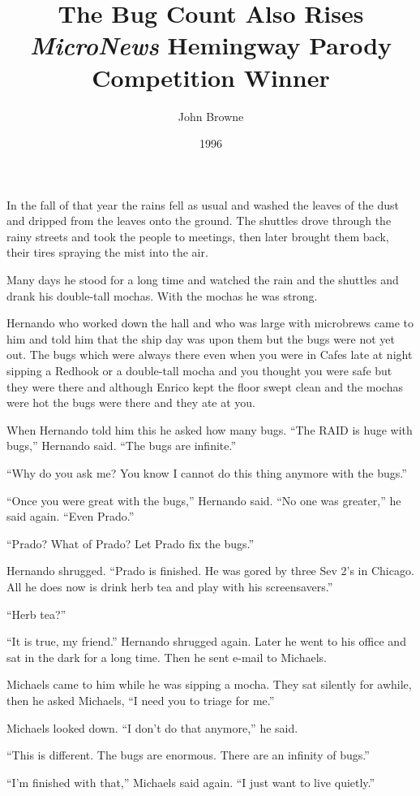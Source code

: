 \documentclass[12pt,letterpaper]{article}
\title{The Bug Count Also Rises\\
\normalsize \textit{MicroNews} Hemingway Parody Competition Winner}
\author{John Browne}
\date{1996}
\begin{document}
\maketitle

\noindent In the fall of that year the rains fell as usual and washed
the leaves of the dust and dripped from the leaves onto the
ground. The shuttles drove through the rainy streets and took the
people to meetings, then later brought them back, their tires spraying
the mist into the air.

Many days he stood for a long time and watched
the rain and the shuttles and drank his double-tall mochas. With the
mochas he was strong.

Hernando who worked down the hall and who was large with microbrews
came to him and told him that the ship day was upon them but the bugs
were not yet out. The bugs which were always there even when you were
in Cafes late at night sipping a Redhook or a double-tall mocha and
you thought you were safe but they were there and although Enrico kept
the floor swept clean and the mochas were hot the bugs were there and
they ate at you.

When Hernando told him this he asked how many bugs.
``The RAID is huge with bugs,'' Hernando said. ``The bugs are infinite.''

``Why do you ask me? You know I cannot do this thing anymore with the
bugs.''

``Once you were great with the bugs,'' Hernando said. ``No one was
greater,'' he said again. ``Even Prado.''

``Prado? What of Prado? Let Prado fix the bugs.''

Hernando shrugged. ``Prado is finished. He was gored by three Sev 2's
in Chicago. All he does now is drink herb tea and play with his
screensavers.''

``Herb tea?''

``It is true, my friend.'' Hernando shrugged again.
Later he went to his office and sat in the dark for a long time. Then
he sent e-mail to Michaels.

Michaels came to him while he was sipping a mocha. They sat silently
for awhile, then he asked Michaels, ``I need you to triage for me.''

Michaels looked down. ``I don't do that anymore,'' he said.

``This is different. The bugs are enormous. There are an infinity of
bugs.''

``I'm finished with that,'' Michaels said again. ``I just want to live
quietly.''
\end{document}
